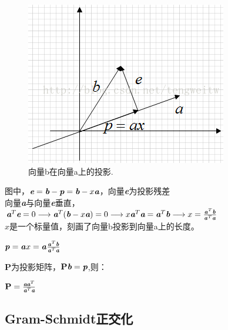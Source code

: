 \begin{figure}[h]%
	\centering  %
	\includegraphics[width=0.7\linewidth]{math/img/1}  %
	\caption{向量b在向量a上的投影.}  %
	\label{fig:mcmthesis-logo}   %
\end{figure}
\noindent 图中，$\textit{\textbf{e}}=\textit{\textbf{b}}-\textit{\textbf{p}}=\textit{\textbf{b}}-x\textit{\textbf{a}}$，向量\textit{\textbf{e}}为投影残差\\
向量\textit{\textbf{a}}与向量\textit{\textbf{e}}垂直，\\ 
$\textit{\textbf{a}}^T\textit{\textbf{e}}=0 \longrightarrow \textit{\textbf{a}}^T(\textit{\textbf{b}}-x\textit{\textbf{a}})=0 \longrightarrow x\textit{\textbf{a}}^T\textit{\textbf{a}}=\textit{\textbf{a}}^T\textit{\textbf{b}} \longrightarrow x = \frac{\textbf{\textit{a}}^T\textbf{\textit{b}}}{\textbf{\textit{a}}^T\textbf{\textit{a}}}$\\
$x$是一个标量值，刻画了向量b投影到向量a上的长度。\\
\begin{center}
$\textbf{\textit{p}}=\textbf{\textit{a}}x = \textbf{\textit{a}}\frac{\textbf{\textit{a}}^T\textbf{\textit{b}}}{\textbf{\textit{a}}^T\textit{\textbf{a}}}$\\
\end{center}
\textbf{P}为投影矩阵，$\textbf{P}\textit{\textbf{b}}=\textit{\textbf{p}}$,则：
\begin{center}
$\textbf{P}=\frac{\textit{\textbf{a}}\textit{\textbf{a}}^T}{\textit{\textbf{a}}^T\textit{\textbf{a}}}$	
\end{center}


\subsection*{Gram-Schmidt正交化}
